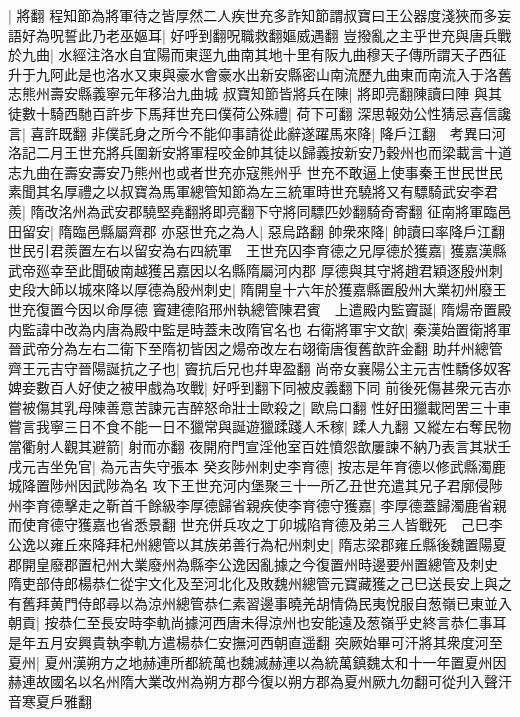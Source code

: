 |{
	將翻}
程知節為將軍待之皆厚然二人疾世充多詐知節謂叔寶曰王公器度淺狹而多妄語好為呪誓此乃老巫嫗耳|{
	好呼到翻呪職救翻嫗威遇翻}
豈撥亂之主乎世充與唐兵戰於九曲|{
	水經注洛水自宜陽而東逕九曲南其地十里有阪九曲穆天子傳所謂天子西征升于九阿此是也洛水又東與豪水會豪水出新安縣密山南流歷九曲東而南流入于洛舊志熊州壽安縣義寧元年移治九曲城}
叔寶知節皆將兵在陳|{
	將即亮翻陳讀曰陣}
與其徒數十騎西馳百許步下馬拜世充曰僕荷公殊禮|{
	荷下可翻}
深思報効公性猜忌喜信讒言|{
	喜許既翻}
非僕託身之所今不能仰事請從此辭遂躍馬來降|{
	降戶江翻　考異曰河洛記二月王世充將兵圍新安將軍程咬金帥其徒以歸義按新安乃穀州也而梁載言十道志九曲在壽安壽安乃熊州也或者世充亦寇熊州乎}
世充不敢逼上使事秦王世民世民素聞其名厚禮之以叔寶為馬軍總管知節為左三統軍時世充驍將又有驃騎武安李君羨|{
	隋改洺州為武安郡驍堅堯翻將即亮翻下守將同驃匹妙翻騎奇寄翻}
征南將軍臨邑田留安|{
	隋臨邑縣屬齊郡}
亦惡世充之為人|{
	惡烏路翻}
帥衆來降|{
	帥讀曰率降戶江翻}
世民引君羨置左右以留安為右四統軍　王世充囚李育德之兄厚德於獲嘉|{
	獲嘉漢縣武帝廵幸至此聞破南越獲呂嘉因以名縣隋屬河内郡}
厚德與其守將趙君穎逐殷州刺史段大師以城來降以厚德為殷州刺史|{
	隋開皇十六年於獲嘉縣置殷州大業初州廢王世充復置今因以命厚德}
竇建德陷邢州執總管陳君賓　上遣殿内監竇誕|{
	隋煬帝置殿内監諱中改為内唐為殿中監是時蓋未改隋官名也}
右衛將軍宇文歆|{
	秦漢始置衛將軍晉武帝分為左右二衛下至隋初皆因之煬帝改左右翊衛唐復舊歆許金翻}
助幷州總管齊王元吉守晉陽誕抗之子也|{
	竇抗后兄也幷卑盈翻}
尚帝女襄陽公主元吉性驕侈奴客婢妾數百人好使之被甲戲為攻戰|{
	好呼到翻下同被皮義翻下同}
前後死傷甚衆元吉亦嘗被傷其乳母陳善意苦諫元吉醉怒命壯士歐殺之|{
	歐烏口翻}
性好田獵載罔罟三十車嘗言我寧三日不食不能一日不獵常與誕遊獵蹂踐人禾稼|{
	蹂人九翻}
又縱左右奪民物當衢射人觀其避箭|{
	射而亦翻}
夜開府門宣淫他室百姓憤怨歆屢諫不納乃表言其狀壬戌元吉坐免官|{
	為元吉失守張本}
癸亥陟州刺史李育德|{
	按志是年育德以修武縣濁鹿城降置陟州因武陟為名}
攻下王世充河内堡聚三十一所乙丑世充遣其兄子君廓侵陟州李育德擊走之靳首千餘級李厚德歸省親疾使李育德守獲嘉|{
	李厚德蓋歸濁鹿省親而使育德守獲嘉也省悉景翻}
世充併兵攻之丁卯城陷育德及弟三人皆戰死　己巳李公逸以雍丘來降拜杞州總管以其族弟善行為杞州刺史|{
	隋志梁郡雍丘縣後魏置陽夏郡開皇廢郡置杞州大業廢州為縣李公逸因亂據之今復置州時邊要州置總管及刺史}
隋吏部侍郎楊恭仁從宇文化及至河北化及敗魏州總管元寶藏獲之己巳送長安上與之有舊拜黄門侍郎尋以為涼州總管恭仁素習邊事曉羌胡情偽民夷悅服自葱嶺已東並入朝貢|{
	按恭仁至長安時李軌尚據河西唐未得涼州也安能遠及葱嶺乎史終言恭仁事耳是年五月安興貴執李軌方遣楊恭仁安撫河西朝直遥翻}
突厥始畢可汗將其衆度河至夏州|{
	夏州漢朔方之地赫連所都統萬也魏滅赫連以為統萬鎮魏太和十一年置夏州因赫連故國名以名州隋大業改州為朔方郡今復以朔方郡為夏州厥九勿翻可從刋入聲汗音寒夏戶雅翻}
